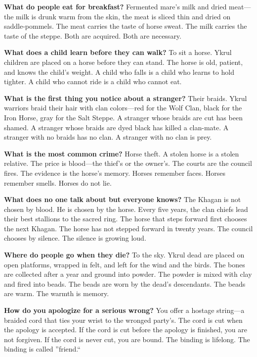 \vspace{1em}

\begin{almanac}
\textbf{What do people eat for breakfast?} Fermented mare's milk and dried meat---the milk is drunk warm from the skin, the meat is sliced thin and dried on saddle-pommels. The meat carries the taste of horse sweat. The milk carries the taste of the steppe. Both are acquired. Both are necessary.

\textbf{What does a child learn before they can walk?} To sit a horse. Ykrul children are placed on a horse before they can stand. The horse is old, patient, and knows the child's weight. A child who falls is a child who learns to hold tighter. A child who cannot ride is a child who cannot eat.

\textbf{What is the first thing you notice about a stranger?} Their braids. Ykrul warriors braid their hair with clan colors---red for the Wolf Clan, black for the Iron Horse, gray for the Salt Steppe. A stranger whose braids are cut has been shamed. A stranger whose braids are dyed black has killed a clan-mate. A stranger with no braids has no clan. A stranger with no clan is prey.

\textbf{What is the most common crime?} Horse theft. A stolen horse is a stolen relative. The price is blood---the thief's or the owner's. The courts are the council fires. The evidence is the horse's memory. Horses remember faces. Horses remember smells. Horses do not lie.

\textbf{What does no one talk about but everyone knows?} The Khagan is not chosen by blood. He is chosen by the horse. Every five years, the clan chiefs lead their best stallions to the sacred ring. The horse that steps forward first chooses the next Khagan. The horse has not stepped forward in twenty years. The council chooses by silence. The silence is growing loud.

\textbf{Where do people go when they die?} To the sky. Ykrul dead are placed on open platforms, wrapped in felt, and left for the wind and the birds. The bones are collected after a year and ground into powder. The powder is mixed with clay and fired into beads. The beads are worn by the dead's descendants. The beads are warm. The warmth is memory.

\textbf{How do you apologize for a serious wrong?} You offer a hostage string---a braided cord that ties your wrist to the wronged party's. The cord is cut when the apology is accepted. If the cord is cut before the apology is finished, you are not forgiven. If the cord is never cut, you are bound. The binding is lifelong. The binding is called ''friend.``


\end{almanac}
